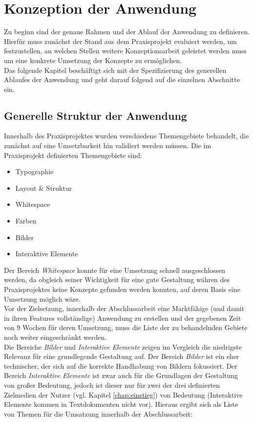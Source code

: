 \chapter{Konzeption der Anwendung}
\thispagestyle{fancy}
\label{chap:concept}

Zu beginn sind der genaue Rahmen und der Ablauf der Anwendung zu definieren. Hierfür muss zunächst der Stand aus dem Praxisprojekt evaluiert werden, um festzustellen, an welchen Stellen weitere Konzeptionsarbeit geleistet werden muss um eine konkrete Umsetzung der Konzepte zu ermöglichen.\\
Das folgende Kapitel beschäftigt sich mit der Spezifizierung des generellen Ablaufes der Anwendung und geht darauf folgend auf die einzelnen Abschnitte ein.

\section{Generelle Struktur der Anwendung}
Innerhalb des Praxisprojektes wurden verschiedene Themengebiete behandelt, die zunächst auf eine Umsetzbarkeit hin validiert werden müssen. Die im Praxisprojekt definierten Themengebiete \cite{PoplawskiPP} sind:

\begin{itemize}
  \item Typographie
  \item Layout \& Struktur
  \item Whitespace
  \item Farben
  \item Bilder
  \item Interaktive Elemente
\end{itemize}

Der Bereich \textit{Whitespace} konnte für eine Umsetzung schnell ausgeschlossen werden, da obgleich seiner Wichtigkeit für eine gute Gestaltung währen des Praxisprojektes keine Konzepte gefunden werden konnten, auf deren Basis eine Umsetzung möglich wäre.\\
Vor der Zielsetzung, innerhalb der Abschlussarbeit eine Marktfähige (und damit in ihren Features vollständige) Anwendung zu erstellen und der gegebenen Zeit von 9 Wochen für deren Umsetzung, muss die Liste der zu behandelnden Gebiete noch weiter eingeschränkt werden.\\
Die Bereiche \textit{Bilder} und \textit{Interaktive Elemente} zeigen im Vergleich die niedrigste Relevanz für eine grundlegende Gestaltung auf. Der Bereich \textit{Bilder} ist ein eher technischer, der sich auf die korrekte Handhabung von Bildern fokussiert. Der Bereich \textit{Interaktive Elemente} ist zwar auch für die Grundlagen der Gestaltung von großer Bedeutung, jedoch ist dieser nur für zwei der drei definierten Zielmedien der Nutzer (vgl. Kapitel \ref{chap:einstieg}) von Bedeutung (Interaktive Elemente kommen in Textdokumenten nicht vor). Hieraus ergibt sich als Liste von Themen für die Umsatzung innerhalb der Abschlussarbeit:

